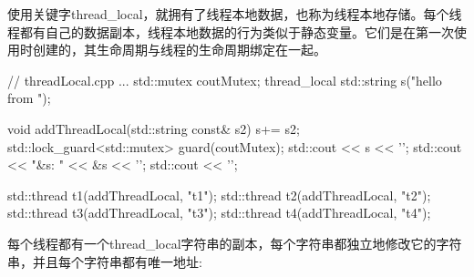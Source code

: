 
使用关键字thread\_local，就拥有了线程本地数据，也称为线程本地存储。每个线程都有自己的数据副本，线程本地数据的行为类似于静态变量。它们是在第一次使用时创建的，其生命周期与线程的生命周期绑定在一起。


\begin{cpp}
	// threadLocal.cpp
	...
	std::mutex coutMutex;
	thread_local std::string s("hello from ");
	
	void addThreadLocal(std::string const& s2){
		s+= s2;
		std::lock_guard<std::mutex> guard(coutMutex);
		std::cout << s << '\n';
		std::cout << "&s: " << &s << '\n';
		std::cout << '\n';
	}
	
	std::thread t1(addThreadLocal, "t1");
	std::thread t2(addThreadLocal, "t2");
	std::thread t3(addThreadLocal, "t3");
	std::thread t4(addThreadLocal, "t4");
\end{cpp}

每个线程都有一个thread\_local字符串的副本，每个字符串都独立地修改它的字符串，并且每个字符串都有唯一地址:













































